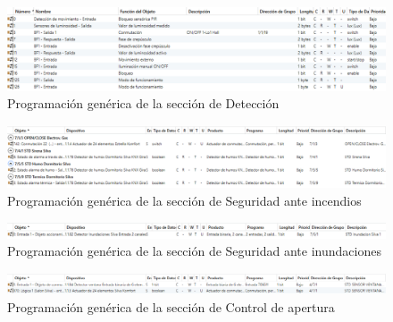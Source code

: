 \begin{landscape}
\begin{figure}[H]
\includegraphics[width=1.55\textwidth]{figures/prog_mov.png}   
\caption{Programación genérica de la sección de Detección}
\label{fig:prog_mov}
\end{figure}

\begin{figure}[H]
\includegraphics[width=1.55\textwidth]{figures/prog_humo.png}   
\caption{Programación genérica de la sección de Seguridad ante incendios}
\label{fig:prog_humo}
\end{figure}
 \vspace{2cm}

\begin{figure}[H]
\includegraphics[width=1.55\textwidth]{figures/prog_inun.png}   
\caption{Programación genérica de la sección de Seguridad ante inundaciones}
\label{fig:prog_inun}
\end{figure}
 \vspace{2cm}

\begin{figure}[H]
\includegraphics[width=1.55\textwidth]{figures/prog_vent.png}   
\caption{Programación genérica de la sección de Control de apertura}
\label{fig:prog_vent}
\end{figure}
\end{landscape}


